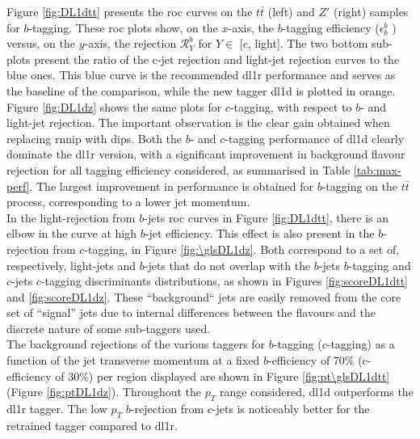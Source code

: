 Figure \ref{fig:DL1dtt} presents the \gls{roc} curves on the $t\bar{t}$ (left) and $Z'$ (right) samples for  $b$-tagging. These \gls{roc} plots show, on the $x$-axis, the $b$-tagging efficiency ($\epsilon^b_b$ ) versus, on the $y$-axis, the rejection $\mathcal{R}^b_Y$ for $Y \in$ [$c$, light]. The two bottom sub-plots present the ratio of the c-jet rejection and light-jet rejection curves to the blue ones. This blue curve is the recommended \gls{dl1r} performance and serves as the baseline of the comparison, while the new tagger \gls{dl1d} is plotted in orange. Figure \ref{fig:DL1dz} shows the same plots for $c$-tagging, with respect to $b$- and light-jet rejection.  The important observation is the clear gain obtained when replacing \gls{rnnip} with \gls{dips}. Both the $b$- and $c$-tagging performance of \gls{dl1d} clearly dominate the \gls{dl1r} version, with a significant improvement in background flavour rejection for all tagging efficiency considered, as summarised in Table \ref{tab:max-perf}. The largest improvement in performance is obtained for $b$-tagging on the $t\bar{t}$ process, corresponding to a lower jet momentum. \\

In the light-rejection from $b$-jets \gls{roc} curves in Figure \ref{fig:DL1dtt}, there is an elbow in the curve at high $b$-jet efficiency. This effect is also present in the $b$-rejection from $c$-tagging, in Figure \ref{fig:\glsDL1dz}. Both correspond to a set of, respectively, light-jets and $b$-jets that do not overlap with the $b$-jets $b$-tagging and $c$-jets $c$-tagging discriminants distributions, as shown in Figures \ref{fig:scoreDL1dtt} and \ref{fig:scoreDL1dz}. These ``background`` jets are easily removed from the core set of ``signal'' jets due to internal differences between the flavours and the discrete nature of some sub-taggers used.  \\

The background rejections of the various taggers for $b$-tagging ($c$-tagging) as a function of the jet transverse momentum at a fixed $b$-efficiency of 70\% ($c$-efficiency of 30\%) per region displayed are shown in Figure \ref{fig:pt\glsDL1dtt} (Figure \ref{fig:ptDL1dz}). Throughout the $p_T$ range considered, \gls{dl1d} outperforms the \gls{dl1r} tagger. The low $p_T$ $b$-rejection from $c$-jets is noticeably better for the retrained tagger compared to \gls{dl1r}. 

